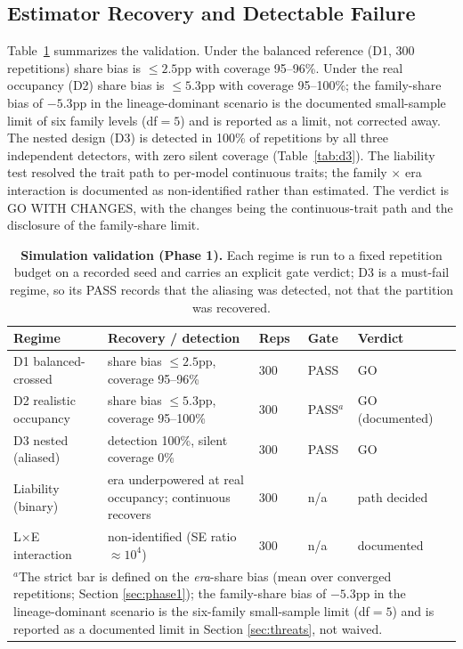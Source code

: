 \documentclass{ieeeaccess}
\theoremstyle{definition}
\theoremstyle{plain}
\begin{document}
\subsection{Estimator Recovery and Detectable Failure}
\label{sec:results-phase1}
Table~\ref{tab:sim} summarizes the validation. Under the balanced reference (D1,
300 repetitions) share bias is $\le2.5$pp with coverage 95--96\%. Under the real
occupancy (D2) share bias is $\le5.3$pp with coverage 95--100\%; the family-share
bias of $-5.3$pp in the lineage-dominant scenario is the documented small-sample
limit of six family levels (df$=5$) and is reported as a limit, not corrected
away. The nested design (D3) is detected in 100\% of repetitions by all three
independent detectors, with zero silent coverage (Table~\ref{tab:d3}). The
liability test resolved the
trait path to per-model continuous traits; the family $\times$ era interaction is
documented as non-identified rather than estimated. The verdict is GO WITH CHANGES,
with the changes being the continuous-trait path and the disclosure of the
family-share limit.

\begin{table}[!t]
\caption{\textbf{Simulation validation (Phase 1).} Each regime is run to a
fixed repetition budget on a recorded seed and carries an explicit gate
verdict; D3 is a must-fail regime, so its PASS records that the aliasing was
detected, not that the partition was recovered.}
\label{tab:sim}
\setlength{\tabcolsep}{5pt}
\begin{tabular}{|p{86pt}|p{194pt}|p{44pt}|p{46pt}|p{70pt}|}
\hline
Regime & Recovery / detection & Reps & Gate & Verdict \\
\hline
D1 balanced-crossed & share bias $\le2.5$pp, coverage 95--96\% & 300 & PASS & GO \\
D2 realistic occupancy & share bias $\le5.3$pp, coverage 95--100\% & 300 & PASS$^{a}$ & GO (documented) \\
D3 nested (aliased) & detection 100\%, silent coverage 0\% & 300 & PASS & GO \\
Liability (binary) & era underpowered at real occupancy; continuous recovers & 300 & n/a & path decided \\
L$\times$E interaction & non-identified (SE ratio $\approx10^{4}$) & 300 & n/a & documented \\
\hline
\multicolumn{5}{p{470pt}}{$^{a}$The strict bar is defined on the \emph{era}-share
bias (mean over converged repetitions; Section \ref{sec:phase1}); the family-share
bias of $-5.3$pp in the lineage-dominant scenario is the six-family small-sample
limit (df$=5$) and is reported as a documented limit in Section
\ref{sec:threats}, not waived.}\\
\end{tabular}
\end{table}
\end{document}
